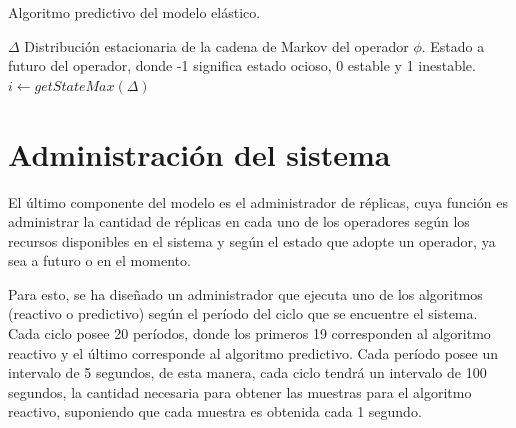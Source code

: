 \begin{algorithm}[!ht]
	\caption{Algoritmo predictivo del modelo elástico.}
	\label{alg:predictive}
	\begin{algorithmic}[1]
	\REQUIRE$\Delta$ Distribución estacionaria de la cadena de Markov del operador $\phi$.
	\ENSURE Estado a futuro del operador, donde -1 significa estado ocioso, 0 estable y 1 inestable.
		\STATE $i \leftarrow getStateMax(\Delta)$ 
		\ELSE
		\ENDIF
	\ENDIF
	
	
	\end{algorithmic}
\end{algorithm}

\section{Administración del sistema}

El último componente del modelo es el administrador de réplicas, cuya función es administrar la cantidad de réplicas en cada uno de los operadores según los recursos disponibles en el sistema y según el estado que adopte un operador, ya sea a futuro o en el momento.

Para esto, se ha diseñado un administrador que ejecuta uno de los algoritmos (reactivo o predictivo) según el período del ciclo que se encuentre el sistema. Cada ciclo posee 20 períodos, donde los primeros 19 corresponden al algoritmo reactivo y el último corresponde al algoritmo predictivo. Cada período posee un intervalo de 5 segundos, de esta manera, cada ciclo tendrá un intervalo de 100 segundos, la cantidad necesaria para obtener las muestras para el algoritmo reactivo, suponiendo que cada muestra es obtenida cada 1 segundo.

